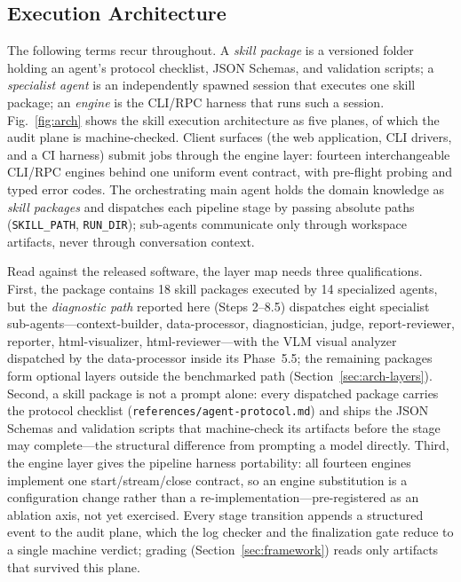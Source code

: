 \documentclass[preprint,10pt]{elsarticle}
\begin{document}
\subsection{Execution Architecture}
The following terms recur throughout. A \emph{skill package} is a versioned folder holding an agent's protocol checklist, JSON Schemas, and validation scripts; a \emph{specialist agent} is an independently spawned session that executes one skill package; an \emph{engine} is the CLI/RPC harness that runs such a session. Fig.~\ref{fig:arch} shows the skill execution architecture as five planes, of which the audit plane is machine-checked. Client surfaces (the web application, CLI drivers, and a CI harness) submit jobs through the engine layer: fourteen interchangeable CLI/RPC engines behind one uniform event contract, with pre-flight probing and typed error codes. The orchestrating main agent holds the domain knowledge as \emph{skill packages} and dispatches each pipeline stage by passing absolute paths (\texttt{SKILL\_PATH}, \texttt{RUN\_DIR}); sub-agents communicate only through workspace artifacts, never through conversation context.

Read against the released software, the layer map needs three qualifications. First, the package contains 18 skill packages executed by 14 specialized agents, but the \emph{diagnostic path} reported here (Steps 2--8.5) dispatches eight specialist sub-agents---context-builder, data-processor, diagnostician, judge, report-reviewer, reporter, html-visualizer, html-reviewer---with the VLM visual analyzer dispatched by the data-processor inside its Phase~5.5; the remaining packages form optional layers outside the benchmarked path (Section~\ref{sec:arch-layers}). Second, a skill package is not a prompt alone: every dispatched package carries the protocol checklist (\texttt{references/agent-protocol.md}) and ships the JSON Schemas and validation scripts that machine-check its artifacts before the stage may complete---the structural difference from prompting a model directly. Third, the engine layer gives the pipeline harness portability: all fourteen engines implement one start/stream/close contract, so an engine substitution is a configuration change rather than a re-implementation---pre-registered as an ablation axis, not yet exercised. Every stage transition appends a structured event to the audit plane, which the log checker and the finalization gate reduce to a single machine verdict; grading (Section~\ref{sec:framework}) reads only artifacts that survived this plane.
\end{document}
